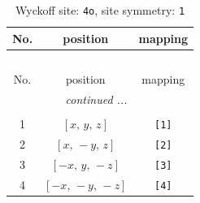 \documentclass[fleqn,8pt]{jsarticle}
\begin{document}
\renewcommand{\arraystretch}{1.2}
\begin{longtable}{ccc}
\caption{Wyckoff site: {\tt 4o}, site symmetry: {\tt 1}}
 \\
 \hline \hline
No. & position & mapping \\ \hline \endfirsthead

\multicolumn{2}{l}{\tablename\ \thetable{}} \\
 \hline \hline
No. & position & mapping \\ \hline \endhead

 \hline \hline
\multicolumn{2}{r}{\footnotesize\it continued ...} \\ \endfoot

 \hline \hline
\multicolumn{2}{r}{} \\ \endlastfoot

1 & $\left[ x,\, y,\, z \right]$ & {\tt [1]} \\ \hline
2 & $\left[ x,\, - y,\, z \right]$ & {\tt [2]} \\ \hline
3 & $\left[ - x,\, y,\, - z \right]$ & {\tt [3]} \\ \hline
4 & $\left[ - x,\, - y,\, - z \right]$ & {\tt [4]} \\
\end{longtable}
\end{document}
